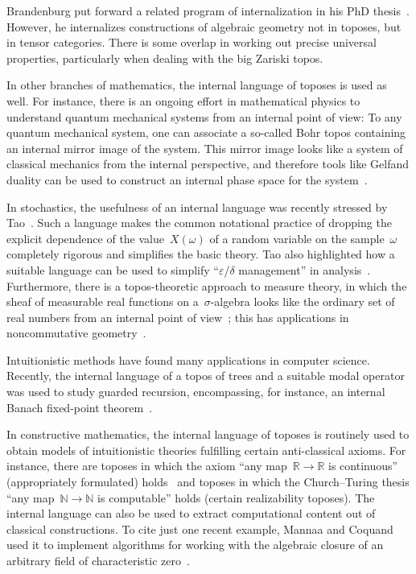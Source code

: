 \documentclass[10pt,reqno,a4paper]{amsbook}
\theoremstyle{definition}
\theoremstyle{plain}
\theoremstyle{remark}
\newcommand{\NN}{\mathbb{N}}
\newcommand{\RR}{\mathbb{R}}
\newcommand{\?}{\,{:}\,}
\renewcommand{\_}{\mathpunct{.}\,}
\begin{document}
{Brandenburg put forward a related program of internalization in his PhD
thesis~\cite{brandenburg:tensor-foundations}. However, he internalizes
constructions of algebraic geometry not in toposes, but in tensor categories.
There is some overlap in working out precise universal properties, particularly
when dealing with the big Zariski topos.

In other branches of mathematics, the internal language of toposes is used as well. For
instance, there is an ongoing effort in mathematical physics to understand
quantum mechanical systems from an internal point of view: To any quantum
mechanical system, one can associate a so-called Bohr topos containing an
internal mirror image of the system. This mirror image looks like a
system of classical mechanics from the internal perspective, and therefore
tools like Gelfand duality can be used to construct an internal
phase space for the system~\cite{bohr1,bohr2,bohr3}.

In stochastics, the usefulness of an internal language was recently stressed by
Tao~\cite{tao:analysis-rel-measure-space}. Such a language makes the
common notational practice of dropping the explicit dependence of the
value~$X(\omega)$ of a random variable on the sample~$\omega$ completely
rigorous and simplifies the basic theory. Tao also highlighted how a suitable
language can be used to simplify ``$\varepsilon$/$\delta$ management'' in
analysis~\cite{tao:cheap-nsa}. Furthermore, there is a topos-theoretic approach to
measure theory, in which the sheaf of measurable real functions on
a~$\sigma$-algebra looks like the ordinary set of real numbers from an internal point
of view~\cite{jackson:sheaf-theoretic-measure-theory}; this has applications in
noncommutative geometry~\cite{henry:measure-theory-boolean-toposes}.

Intuitionistic methods have found many applications in computer science.
Recently, the internal language of a topos of trees and a suitable modal
operator was used to study guarded recursion, encompassing, for instance, an
internal Banach fixed-point theorem~\cite{birkedal:al:sgdt}.

In constructive mathematics, the internal language of toposes is routinely used
to obtain models of intuitionistic theories fulfilling certain anti-classical
axioms. For instance, there are toposes in which the axiom ``any map~$\RR \to
\RR$ is continuous'' (appropriately formulated) holds~\cite{kock:sdg,moerdijk:reyes:models}
and toposes in which the Church--Turing thesis ``any map~$\NN \to \NN$ is
computable'' holds (certain realizability toposes).
The internal language can also be used to extract computational content
out of classical constructions. To cite just one recent example, Mannaa and
Coquand used it to implement algorithms for working with the algebraic closure
of an arbitrary field of characteristic zero~\cite{mannaa:coquand:alg-closure}.

}
\end{document}
